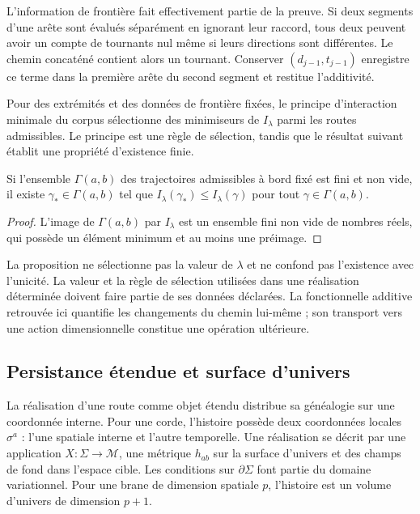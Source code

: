 L’information de frontière fait effectivement partie de la preuve.
Si deux segments d’une arête sont évalués séparément
en ignorant leur raccord, tous deux peuvent avoir un compte
de tournants nul même si leurs directions sont différentes. Le
chemin concaténé contient alors un tournant. Conserver
\((d_{j-1},t_{j-1})\) enregistre ce terme dans la première
arête du second segment et restitue l’additivité.

Pour des extrémités et des données de frontière fixées, le principe
d’interaction minimale du corpus sélectionne des minimiseurs de
\(I_\lambda\) parmi les routes admissibles. Le principe
est une règle de sélection, tandis que le résultat
suivant établit une propriété d’existence finie.


\begin{proposition}
Si l’ensemble \(\Gamma(a,b)\) des trajectoires admissibles
à bord fixé est fini et non vide, il existe
\(\gamma_*\in\Gamma(a,b)\) tel que
\(I_\lambda(\gamma_*)\leq I_\lambda(\gamma)\)
pour tout \(\gamma\in\Gamma(a,b)\).
\end{proposition}
\begin{proof}
L’image de \(\Gamma(a,b)\) par \(I_\lambda\) est
un ensemble fini non vide de nombres réels, qui possède
un élément minimum et au moins une préimage.

\end{proof}

La proposition ne sélectionne pas la valeur de \(\lambda\)
et ne confond pas l’existence avec l’unicité. La valeur et la règle
de sélection utilisées dans une réalisation déterminée
doivent faire partie de ses données déclarées. La fonctionnelle
additive retrouvée ici quantifie les changements du chemin
lui-même ; son transport vers une action dimensionnelle constitue
une opération ultérieure.

\subsection{Persistance étendue et surface d’univers}

La réalisation d’une route comme objet étendu distribue
sa généalogie sur une coordonnée interne. Pour une corde,
l’histoire possède deux coordonnées locales \(\sigma^a\) :
l’une spatiale interne et l’autre temporelle. Une réalisation se
décrit par une application \(X:\Sigma\to\mathcal M\), une
métrique \(h_{ab}\) sur la surface d’univers et des champs
de fond dans l’espace cible. Les conditions sur
\(\partial\Sigma\) font partie du domaine variationnel.
Pour une brane de dimension spatiale \(p\), l’histoire
est un volume d’univers de dimension \(p+1\).


